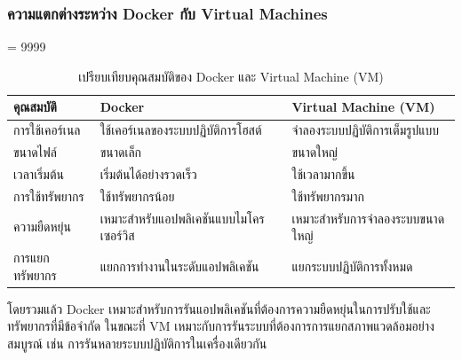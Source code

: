 \subsubsection{ความแตกต่างระหว่าง Docker กับ Virtual Machines}
\tolerance= 9999
\begin{table}[H]
  \centering
  \caption{เปรียบเทียบคุณสมบัติของ Docker และ Virtual Machine (VM)}
  \label{tab:docker-vm}

  \renewcommand{\arraystretch}{1.3} %
  \setlength{\extrarowheight}{3pt}  %
  \setlength{\tabcolsep}{8pt}       %

  
  \begin{tabular}{|>{\raggedright\arraybackslash}p{3cm}|>{\raggedright\arraybackslash}p{5cm}|>{\raggedright\arraybackslash}p{5cm}|}
      \hline
      \rowcolor{gray!20} 
      \textbf{คุณสมบัติ} & \textbf{Docker} & \textbf{Virtual Machine (VM)} \\
      \hline
      การใช้เคอร์เนล & ใช้เคอร์เนลของระบบปฏิบัติการโฮสต์ & จำลองระบบปฏิบัติการเต็มรูปแบบ \\
      \hline
      ขนาดไฟล์ & ขนาดเล็ก & ขนาดใหญ่ \\
      \hline
      เวลาเริ่มต้น & เริ่มต้นได้อย่างรวดเร็ว & ใช้เวลามากขึ้น \\
      \hline
      การใช้ทรัพยากร & ใช้ทรัพยากรน้อย & ใช้ทรัพยากรมาก \\
      \hline
      ความยืดหยุ่น & เหมาะสำหรับแอปพลิเคชันแบบไมโครเซอร์วิส & เหมาะสำหรับการจำลองระบบขนาดใหญ่ \\
      \hline
      การแยกทรัพยากร & แยกการทำงานในระดับแอปพลิเคชัน & แยกระบบปฏิบัติการทั้งหมด \\
      \hline
  \end{tabular}
\end{table}

\hspace{1.27cm}โดยรวมแล้ว Docker เหมาะสำหรับการรันแอปพลิเคชันที่ต้องการความยืดหยุ่นในการปรับใช้และทรัพยากรที่มีข้อจำกัด ในขณะที่ VM เหมาะกับการรันระบบที่ต้องการการแยกสภาพแวดล้อมอย่างสมบูรณ์ เช่น การรันหลายระบบปฏิบัติการในเครื่องเดียวกัน

